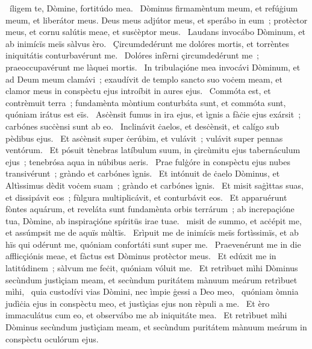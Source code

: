 { }
{%
~íligem te, Dòmine, fortitúdo mea. 
~Dòminus firmamèntum meum, et refúġium meum, et liberátor meus. Deus meus adjútor meus, et sperábo in eum~; protèctor meus, et cornu salútis meae, et susċèptor meus. 
~Laudans invocábo Dòminum, et ab inimícïs meïs sàlvus èro. 
~Çircumdedérunt me dolóres mortis, et torrèntes iniquitátis conturbavérunt me. 
~Dolóres infèrni çircumdedérunt me~; praeoccupavérunt me làquei mortis. 
~In tribulaçióne mea invocávi Dòminum, et ad Deum meum clamávi~; exaudívit de templo sancto suo voċem meam, et clamor meus in conspèctu ejus introíbit in aures ejus. 
~Commóta est, et contrèmuit terra~; fundamènta mòntium conturbáta sunt, et commóta sunt, quóniam irátus est eïs. 
~Asċènsit fumus in ira ejus, et ìgnis a fàċie ejus exársit~; carbónes sucċènsi sunt ab eo. 
~Inclinávit ċaelos, et desċènsit, et calígo sub pèdibus ejus. 
~Et asċènsit super ċerúbim, et vulávit~; vulávit super pennas ventórum. 
~Et pósuit tènebras latíbulum suum, in çircùmitu ejus tabernáculum ejus~; tenebrósa aqua in núbibus aeris. 
~Prae fulġóre in conspèctu ejus nubes transivérunt~; gràndo et carbónes ìgnis. 
~Et intónuit de ċaelo Dòminus, et Altìssimus dèdit voċem suam~; gràndo et carbónes ìgnis. 
~Et misit saġìttas suas, et dissipávit eos~; fùlgura multiplicávit, et conturbávit eos. 
~Et apparuérunt fòntes aquárum, et reveláta sunt fundamènta orbis terrárum~; ab increpaçióne tua, Dòmine, ab inspiraçióne spíritüs irae tuae. 
~misit de summo, et acċépit me, et assúmpsit me de aquïs mùltïs. 
~Erìpuit me de inimícïs meïs fortìssimïs, et ab hïs qui odérunt me, quóniam confortáti sunt super me. 
~Praevenérunt me in die afflicçiónis meae, et fàctus est Dòminus protèctor meus. 
~Et edúxit me in latitúdinem~; sàlvum me feċit, quóniam vóluit me. 
~Et retrìbuet mìhi Dòminus secùndum justìçiam meam, et secùndum puritátem mànuum meárum retrìbuet mìhi, 
~quia custodívi vias Dòmini, nec ìmpie ġessi a Deo meo, 
~quóniam òmnia judìċia ejus in conspèctu meo, et justìçias ejus non rèpuli a me. 
~Et èro immaculátus cum eo, et observábo me ab iniquitáte mea. 
~Et retrìbuet mìhi Dòminus secùndum justìçiam meam, et secùndum puritátem mànuum meárum in conspèctu oculórum ejus. 
}
